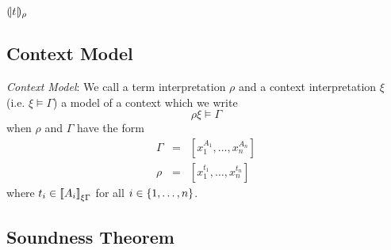 ${(\!|t|\!)_{\rho}}$







\subsection{Context Model}

\begin{definition}
    \label{DefinitionContextModel}
    \emph{Context Model}: We call a term interpretation $\rho$ and a context
    interpretation $\xi$ (i.e. $\xi \vDash \Gamma$) a model of a context which
    we write
    $$
        \rho\xi \vDash \Gamma
    $$
    when
    $\rho$ and $\Gamma$ have the form
    $$
    \begin{array}{lll}
        \Gamma &=& [x_1^{A_1}, \ldots, x_n^{A_n}]
        \\
        \rho   &=& [x_1^{t_1}, \ldots, x_n^{t_n}]
    \end{array}
    $$
    where $t_i \in {{[\![}A_i{]\!]}}_{\xi\Gamma}$ for all $i \in {\{1,\ldots,n\}}$.
\end{definition}




\subsection{Soundness Theorem}

